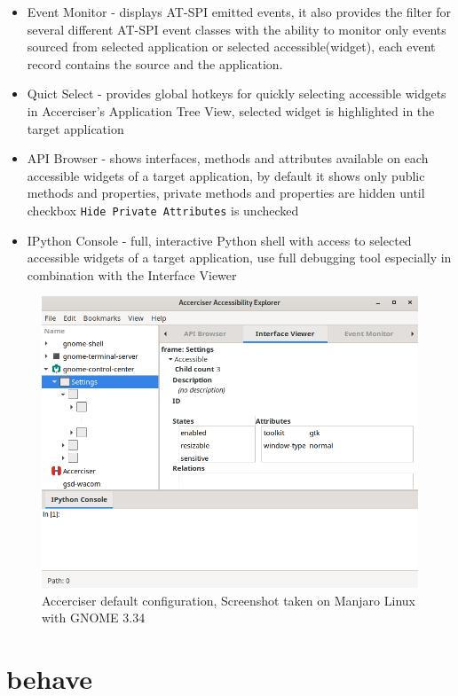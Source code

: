 \begin{itemize}
    \item Event Monitor - displays AT-SPI emitted events, it also provides the filter for several different AT-SPI event classes with the ability to monitor only events sourced from selected application or selected accessible(widget), each event record contains the source and the application.
    \item Quict Select - provides global hotkeys for quickly selecting accessible widgets in Accerciser's Application Tree View, selected widget is highlighted in the target application
    \item API Browser - shows interfaces, methods and attributes available on each accessible widgets of a target application, by default it shows only public methods and properties, private methods and properties are hidden until checkbox \texttt{Hide Private Attributes} is unchecked
    \item IPython Console - full, interactive Python shell with access to selected accessible widgets of a target application, use full debugging tool especially in combination with the Interface Viewer
\end{itemize}

\begin{figure}[hbt]
	\centering
	\includegraphics[width=1\textwidth]{obrazky-figures/accerciser.png}
	\caption{Accerciser default configuration, Screenshot taken on Manjaro Linux with GNOME 3.34}
	\label{Accerciser}
\end{figure}

\chapter{behave}

